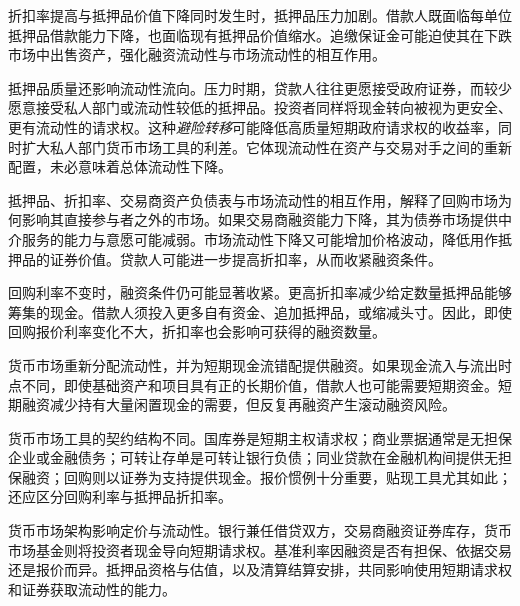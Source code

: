 折扣率提高与抵押品价值下降同时发生时，抵押品压力加剧。借款人既面临每单位抵押品借款能力下降，也面临现有抵押品价值缩水。追缴保证金可能迫使其在下跌市场中出售资产，强化融资流动性与市场流动性的相互作用。

抵押品质量还影响流动性流向。压力时期，贷款人往往更愿接受政府证券，而较少愿意接受私人部门或流动性较低的抵押品。投资者同样将现金转向被视为更安全、更有流动性的请求权。这种\emph{避险转移}可能降低高质量短期政府请求权的收益率，同时扩大私人部门货币市场工具的利差。它体现流动性在资产与交易对手之间的重新配置，未必意味着总体流动性下降。

抵押品、折扣率、交易商资产负债表与市场流动性的相互作用，解释了回购市场为何影响其直接参与者之外的市场。如果交易商融资能力下降，其为债券市场提供中介服务的能力与意愿可能减弱。市场流动性下降又可能增加价格波动，降低用作抵押品的证券价值。贷款人可能进一步提高折扣率，从而收紧融资条件。
\begin{tcolorbox}[
  enhanced,
  breakable,
  colback=white,
  colframe=FinanceBlue,
  boxrule=0.7pt,
  sharp corners,
  borderline west={2.2pt}{0pt}{FinanceBlue},
  title=\textbf{金融视角：利率不变时，更高折扣率也能收紧融资},
  coltitle=white,
  colbacktitle=FinanceBlue,
  fonttitle=\bfseries,
  before skip=1.2em,
  after skip=1.2em
]

回购利率不变时，融资条件仍可能显著收紧。更高折扣率减少给定数量抵押品能够筹集的现金。借款人须投入更多自有资金、追加抵押品，或缩减头寸。因此，即使回购报价利率变化不大，折扣率也会影响可获得的融资数量。

\end{tcolorbox}



货币市场重新分配流动性，并为短期现金流错配提供融资。如果现金流入与流出时点不同，即使基础资产和项目具有正的长期价值，借款人也可能需要短期资金。短期融资减少持有大量闲置现金的需要，但反复再融资产生滚动融资风险。

货币市场工具的契约结构不同。国库券是短期主权请求权；商业票据通常是无担保企业或金融债务；可转让存单是可转让银行负债；同业贷款在金融机构间提供无担保融资；回购则以证券为支持提供现金。报价惯例十分重要，贴现工具尤其如此；还应区分回购利率与抵押品折扣率。

货币市场架构影响定价与流动性。银行兼任借贷双方，交易商融资证券库存，货币市场基金则将投资者现金导向短期请求权。基准利率因融资是否有担保、依据交易还是报价而异。抵押品资格与估值，以及清算结算安排，共同影响使用短期请求权和证券获取流动性的能力。

